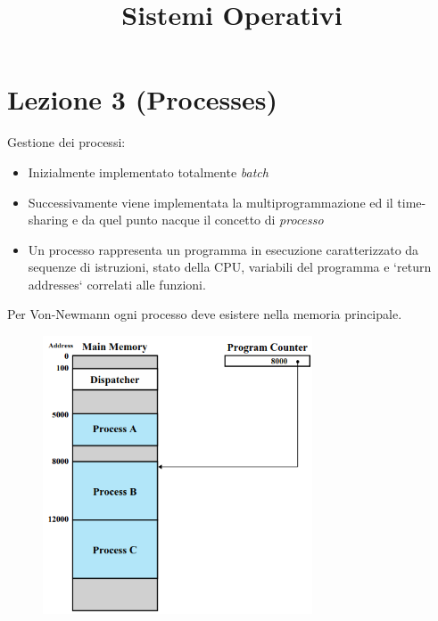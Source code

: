 \documentclass[12pt, a4paper]{article}
\title{Sistemi Operativi}
\date{}
\begin{document}
	
	\section*{Lezione 3 (Processes)}
	
	Gestione dei processi:
	\begin{itemize}
		\item Inizialmente implementato totalmente \textit{batch}
		\item Successivamente viene implementata la multiprogrammazione ed il time-sharing e da quel punto nacque il concetto di \textit{processo}
		\item Un processo rappresenta un programma in esecuzione caratterizzato da sequenze di istruzioni, stato della CPU, variabili del programma e `return  addresses` correlati alle funzioni.
	\end{itemize}
	
	Per Von-Newmann ogni processo deve esistere nella memoria principale. 
	\begin{figure}[!htbp]
		\centering
		\includegraphics[width=8cm]{SO_PNGs/three-processes_SO.png}
		\caption*{}
		\label{fig:three-processes}
	\end{figure}
	
\end{document}
